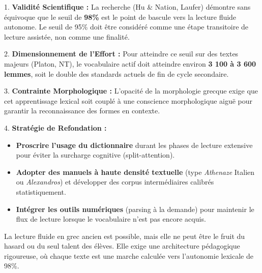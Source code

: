 {{1. \textbf{Validité Scientifique :} La recherche (Hu \& Nation, Laufer) démontre sans équivoque que
le seuil de \textbf{98\%} est le point de bascule vers la lecture fluide autonome. Le seuil de 95\%
doit être considéré comme une étape transitoire de lecture assistée, non comme une finalité.

2. \textbf{Dimensionnement de l'Effort :} Pour atteindre ce seuil sur des textes majeurs (Platon,
NT), le vocabulaire actif doit atteindre environ \textbf{3 100 à 3 600 lemmes}, soit le double des
standards actuels de fin de cycle secondaire.

3. \textbf{Contrainte Morphologique :} L'opacité de la morphologie grecque exige que cet
apprentissage lexical soit couplé à une conscience morphologique aiguë pour garantir la
reconnaissance des formes en contexte.

4. \textbf{Stratégie de Refondation :}

\begin{itemize}\item \textbf{Proscrire l'usage du dictionnaire} durant les phases de lecture extensive pour éviter la surcharge cognitive (split-attention).\item \textbf{Adopter des manuels à haute densité textuelle} (type \textit{Athenaze} Italien ou \textit{Alexandros}) et développer des corpus intermédiaires calibrés statistiquement.\item \textbf{Intégrer les outils numériques} (parsing à la demande) pour maintenir le flux de lecture lorsque le vocabulaire n'est pas encore acquis.\end{itemize}La lecture fluide en grec ancien est possible, mais elle ne peut être le fruit du hasard ou du seul
talent des élèves. Elle exige une architecture pédagogique rigoureuse, où chaque texte est une
marche calculée vers l'autonomie lexicale de 98\%.

}}
